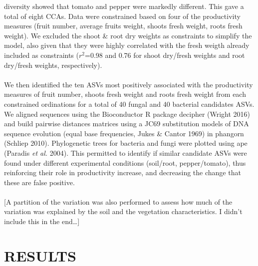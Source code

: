 \documentclass[11pt,]{article}
\begin{document}
diversity showed that tomato and pepper were markedly different. This
gave a total of eight CCAs. Data were constrained based on four of the
productivity measures (fruit number, average fruits weight, shoots fresh
weight, roots fresh weight). We excluded the shoot \& root dry weights
as constraints to simplify the model, also given that they were highly
correlated with the fresh weigth already included as constraints
(\(r^2\)=0.98 and 0.76 for shoot dry/fresh weights and root dry/fresh
weights, respectively). ~\\
\hspace*{0.333em}\\
We then identified the ten ASVs most positively associated with the
productivity measures of fruit number, shoots fresh weight and roots
fresh weight from each constrained ordinations for a total of 40 fungal
and 40 bacterial candidates ASVs. We aligned sequences using the
Bioconductor R package decipher (Wright 2016) and build pairwise
distances matrices using a JC69 substitution models of DNA sequence
evolution (equal base frequencies, Jukes \& Cantor 1969) in phangorn
(Schliep 2010). Phylogenetic trees for bacteria and fungi were plotted
using ape (Paradis \emph{et al.} 2004). This permitted to identify if
similar candidate ASVs were found under different experimental
conditions (soil/root, pepper/tomato), thus reinforcing their role in
productivity increase, and decreasing the change that these are false
positive.\\
\hspace*{0.333em}\\
{[}A partition of the variation was also performed to assess how much of
the variation was explained by the soil and the vegetation
characteristics. I didn't include this in the end\ldots{}{]} ~

\newpage  

\section{RESULTS}\label{results}
\end{document}
